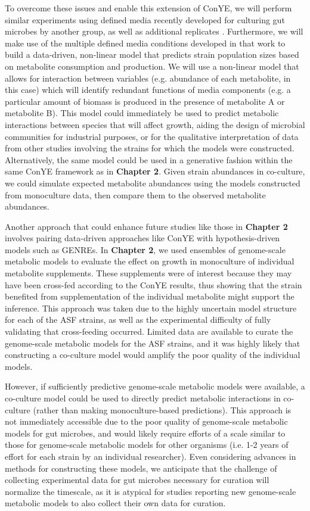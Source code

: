 \documentclass[11pt,twocolumn,notitlepage,openany,twoside]{book}
\begin{document}
\begin{refsection}
To overcome these issues and enable this extension of ConYE, we will perform similar experiments using defined media recently developed for culturing gut microbes by another group, as well as additional replicates \cite{Tramontano2018-xz}. Furthermore, we will make use of the multiple defined media conditions developed in that work to build a data-driven, non-linear model that predicts strain population sizes based on metabolite consumption and production. We will use a non-linear model that allows for interaction between variables (e.g. abundance of each metabolite, in this case) which will identify redundant functions of media components (e.g. a particular amount of biomass is produced in the presence of metabolite A or metabolite B). This model could immediately be used to predict metabolic interactions between species that will affect growth, aiding the design of microbial communities for industrial purposes, or for the qualitative interpretation of data from other studies involving the strains for which the models were constructed. Alternatively, the same model could be used in a generative fashion within the same ConYE framework as in \textbf{Chapter 2}. Given strain abundances in co-culture, we could simulate expected metabolite abundances using the models constructed from monoculture data, then compare them to the observed metabolite abundances.

Another approach that could enhance future studies like those in \textbf{Chapter 2} involves pairing data-driven approaches like ConYE with hypothesis-driven models such as GENREs. In \textbf{Chapter 2}, we used ensembles of genome-scale metabolic models to evaluate the effect on growth in monoculture of individual metabolite supplements. These supplements were of interest because they may have been cross-fed according to the ConYE results, thus showing that the strain benefited from supplementation of the individual metabolite might support the inference. This approach was taken due to the highly uncertain model structure for each of the ASF strains, as well as the experimental difficulty of fully validating that cross-feeding occurred. Limited data are available to curate the genome-scale metabolic models for the ASF strains, and it was highly likely that constructing a co-culture model would amplify the poor quality of the individual models.

However, if sufficiently predictive genome-scale metabolic models were available, a co-culture model could be used to directly predict metabolic interactions in co-culture (rather than making monoculture-based predictions). This approach is not immediately accessible due to the poor quality of genome-scale metabolic models for gut microbes, and would likely require efforts of a scale similar to those for genome-scale metabolic models for other organisms (i.e. 1-2 years of effort for each strain by an individual researcher). Even considering advances in methods for constructing these models, we anticipate that the challenge of collecting experimental data for gut microbes necessary for curation will normalize the timescale, as it is atypical for studies reporting new genome-scale metabolic models to also collect their own data for curation.


\end{refsection}
\end{document}
